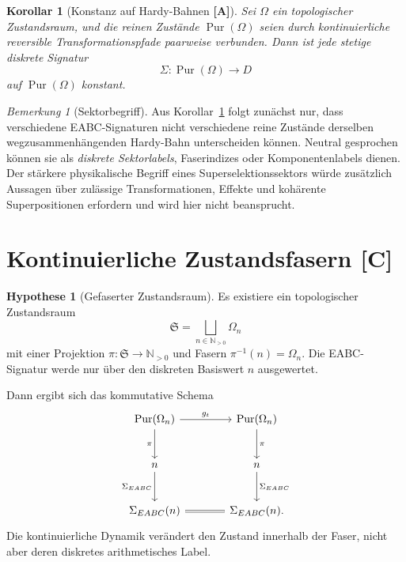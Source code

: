 \documentclass[11pt,a4paper,reqno]{amsart}
\newtheorem{corollary}[theorem]{Korollar}
\theoremstyle{definition}
\newtheorem{hypothesis}[theorem]{Hypothese}
\theoremstyle{remark}
\newtheorem{remark}[theorem]{Bemerkung}
\newcommand{\N}{\mathbb{N}}
\newcommand{\Pur}{\operatorname{Pur}}
\newcommand{\StatusA}{\textnormal{\textbf{[A]}}}
\newcommand{\StatusC}{\textnormal{\textbf{[C]}}}
\begin{document}
\begin{corollary}[Konstanz auf Hardy-Bahnen \StatusA]
\label{cor:hardy-orbits}
Sei $\Omega$ ein topologischer Zustandsraum, und die reinen Zustände $\Pur(\Omega)$ seien durch kontinuierliche reversible Transformationspfade paarweise verbunden. Dann ist jede stetige diskrete Signatur
\[
\Sigma:\Pur(\Omega)\longrightarrow D
\]
auf $\Pur(\Omega)$ konstant.
\end{corollary}

\begin{remark}[Sektorbegriff]
Aus Korollar~\ref{cor:hardy-orbits} folgt zunächst nur, dass verschiedene EABC-Signaturen nicht verschiedene reine Zustände derselben wegzusammenhängenden Hardy-Bahn unterscheiden können. Neutral gesprochen können sie als \emph{diskrete Sektorlabels}, Faserindizes oder Komponentenlabels dienen. Der stärkere physikalische Begriff eines Superselektionssektors würde zusätzlich Aussagen über zulässige Transformationen, Effekte und kohärente Superpositionen erfordern und wird hier nicht beansprucht.
\end{remark}

\section{Kontinuierliche Zustandsfasern \StatusC}

\begin{hypothesis}[Gefaserter Zustandsraum]
\label{hyp:fibers}
Es existiere ein topologischer Zustandsraum
\begin{equation}
\mathfrak S
=
\bigsqcup_{n\in\N_{>0}}\Omega_n
\end{equation}
mit einer Projektion $\pi:\mathfrak S\to\N_{>0}$ und Fasern $\pi^{-1}(n)=\Omega_n$. Die EABC-Signatur werde nur über den diskreten Basiswert $n$ ausgewertet.
\end{hypothesis}

Dann ergibt sich das kommutative Schema
\begin{equation}
\begin{tikzcd}[row sep=large,column sep=large]
\Pur(\Omega_n)
  \arrow[r,"g_t"]
  \arrow[d,"\pi"']
&
\Pur(\Omega_n)
  \arrow[d,"\pi"]
\\
n
  \arrow[d,"\Sigma_{EABC}"']
&
n
  \arrow[d,"\Sigma_{EABC}"]
\\
\Sigma_{EABC}(n)
  \arrow[r,equal]
&
\Sigma_{EABC}(n).
\end{tikzcd}
\end{equation}
Die kontinuierliche Dynamik verändert den Zustand innerhalb der Faser, nicht aber deren diskretes arithmetisches Label.
\end{document}
